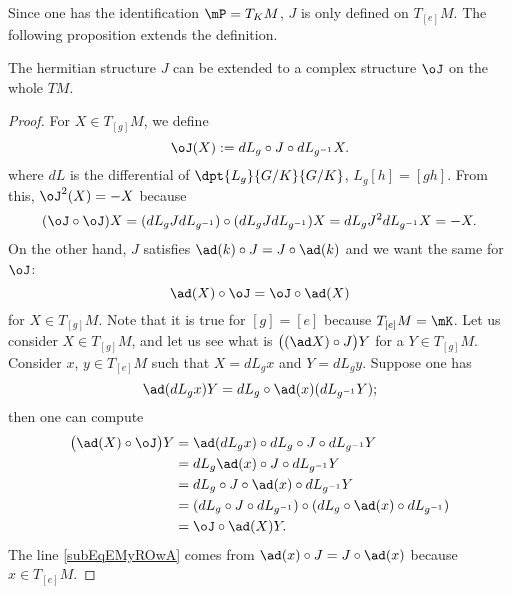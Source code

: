 Since one has the identification $\mP=T_KM$, $J$ is only defined on $T_{[e]}M$. The following proposition extends the definition.

\begin{proposition} \label{prop:ext_J}
    The hermitian structure $J$ can be extended to a complex structure $\oJ$ on the whole $TM$.
\end{proposition}

\begin{proof} 
 For $X\in T_{[g]}M$, we define
\begin{equation} 
  \oJ(X):=dL_g\circ J\circ dL_{g^{-1}}X.
\end{equation}
where $dL$ is the differential of $\dpt{L_g}{G/K}{G/K}$, $L_g[h]=[gh]$.
From this, $\oJ^2(X)=-X$ because
\begin{equation}
  (\oJ\circ\oJ)X=( dL_g J dL_{g^{-1}} )\circ( dL_g J dL_{g^{-1}} )X
           =dL_g J^2dL_{g^{-1}}X
	   =-X.
\end{equation}
On the other hand, $J$ satisfies $\ad(k)\circ J=J\circ \ad(k)$ and we want the same for $\oJ$: 
\[
  \ad(X)\circ\oJ=\oJ\circ\ad(X) 
\]
for $X\in T_{[g]}M$. Note that it is true for $[g]=[e]$ because $T_{[e]}M=\mK$. Let us consider $X\in T_{[g]}M$, and let us see what is $ \big( (\ad X)\circ J \big)Y $ for a $Y\in T_{[g]}M$. Consider $x$, $y\in T_{[e]}M$ such that $X=dL_g x$ and $Y=dL_g y$. Suppose one has 
\begin{equation}\label{eq:suppose}
   \ad(dL_g x)Y=dL_g\circ\ad(x)(dL_{g^{-1}}Y);
\end{equation}
then one can compute
\begin{subequations}
    \begin{align}
\big(  \ad(X)\circ\oJ \big)Y&=\ad(dL_g x)\circ dL_g\circ J\circ dL_{g^{-1}}Y\\
&=dL_g\ad(x) \circ J\circ dL_{g^{-1}}Y\label{subEqEMyROwA}\\
	                    &=dL_g\circ J\circ\ad(x)\circ dL_{g^{-1}}Y\\
			    &=(dL_g\circ J\circ dL_{g^{-1}})\circ (dL_g\circ\ad(x)\circ dL_{g^{-1}})\\
			    &=\oJ\circ\ad(X)Y.
    \end{align}
\end{subequations}
The line \eqref{subEqEMyROwA} comes from $\ad(x)\circ J=J\circ\ad(x)$ because $x\in T_{[e]}M$.
 

\end{proof}
